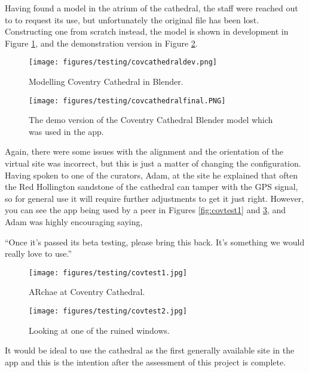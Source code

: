 \documentclass{article}
\begin{document}
Having found a model in the atrium of the cathedral, the staff were reached out to to request its use, but unfortunately the original file has been lost. Constructing one from scratch instead, the model is shown in development in Figure \ref{fig:covdev}, and the demonstration version in Figure \ref{fig:covfinal}.

\begin{figure}
\centering
    \texttt{[image: figures/testing/covcathedraldev.png]}
        \caption{Modelling Coventry Cathedral in Blender.}
        \label{fig:covdev}
\end{figure}

\begin{figure}
\centering
    \texttt{[image: figures/testing/covcathedralfinal.PNG]}
        \caption{The demo version of the Coventry Cathedral Blender model which was used in the app.}
        \label{fig:covfinal}
\end{figure}

Again, there were some issues with the alignment and the orientation of the virtual site was incorrect, but this is just a matter of changing the configuration. Having spoken to one of the curators, Adam, at the site he explained that often the Red Hollington sandstone of the cathedral can tamper with the GPS signal, so for general use it will require further adjustments to get it just right. However, you can see the app being used by a peer in Figures \ref{fig:covtest1} and \ref{fig:covtest2}, and Adam was highly encouraging saying, 

``Once it’s passed its beta testing, please bring this back. It’s something we would really love to use.'' 

\begin{figure}[H]
\centering
\begin{minipage}{.5\textwidth}
  \centering
  \texttt{[image: figures/testing/covtest1.jpg]}
  \caption{ARchae at Coventry Cathedral.}
  \label{fig:covtest1}
\end{minipage}%
\begin{minipage}{.5\textwidth}
  \centering
  \texttt{[image: figures/testing/covtest2.jpg]}
  \caption{Looking at one of the ruined windows.}
  \label{fig:covtest2}
\end{minipage}
\end{figure}

It would be ideal to use the cathedral as the first generally available site in the app and this is the intention after the assessment of this project is complete.
\end{document}
